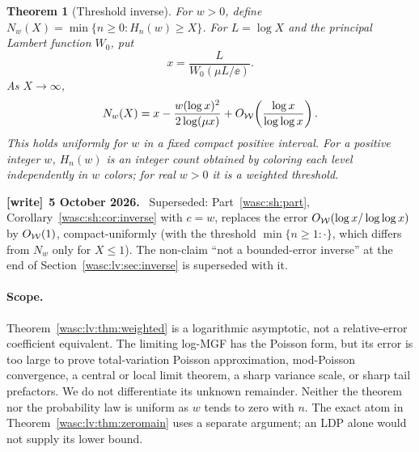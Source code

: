 \documentclass[11pt,a4paper]{article}
\newtheorem{theorem}{Theorem}[section]
\theoremstyle{remark}\newtheorem{remark}[theorem]{Remark}
\numberwithin{equation}{section}
\newenvironment{writenote}[1][]{\par\smallskip\begingroup\small
 \noindent\textbf{[write]}\if\relax\detokenize{#1}\relax\else~\textbf{#1.}\fi\ }%
 {\par\endgroup\smallskip}
\begin{document}
\begin{theorem}[Threshold inverse]\label{wasc:lv:thm:inversemain}
For $w>0$, define $N_w(X)=\min\{n\ge0:H_n(w)\ge X\}$.
For $L=\log X$ and the principal Lambert function $W_0$, put
\[
x=\frac{L}{W_0(\mu L/\ee)}.
\]
As $X\to\infty$,
\begin{equation}\label{wasc:lv:eq:inverse}
N_w(X)=x-\frac{w(\log x)^2}{2\log(\mu x)}
+O_{\mathcal W}\!\left(\frac{\log x}{\log\log x}\right).
\end{equation}
This holds uniformly for $w$ in a fixed compact positive interval. For a positive integer $w$, $H_n(w)$ is an integer count obtained by coloring each level independently in $w$ colors; for real $w>0$ it is a weighted threshold.
\end{theorem}
\begin{writenote}[5 October 2026]
Superseded: Part~\ref{wasc:sh:part}, Corollary~\ref{wasc:sh:cor:inverse} with $c=w$, replaces the error $O_{\mathcal W}(\log x/\log\log x)$ by $O_{\mathcal W}(1)$, compact-uniformly (with the threshold $\min\{n\ge1:\cdot\}$, which differs from $N_w$ only for $X\le1$). The non-claim ``not a bounded-error inverse'' at the end of Section~\ref{wasc:lv:sec:inverse} is superseded with it.
\end{writenote}

\paragraph{Scope.}
Theorem~\ref{wasc:lv:thm:weighted} is a logarithmic asymptotic, not a relative-error coefficient equivalent. The limiting log-MGF has the Poisson form, but its error is too large to prove total-variation Poisson approximation, mod-Poisson convergence, a central or local limit theorem, a sharp variance scale, or sharp tail prefactors. We do not differentiate its unknown remainder. Neither the theorem nor the probability law is uniform as $w$ tends to zero with $n$. The exact atom in Theorem~\ref{wasc:lv:thm:zeromain} uses a separate argument; an LDP alone would not supply its lower bound.
\end{document}
